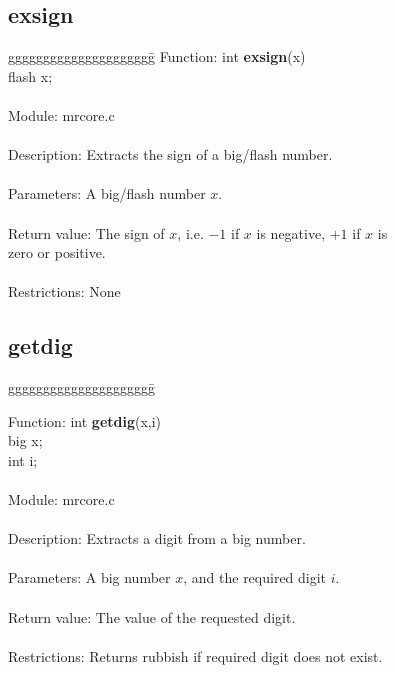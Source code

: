 \subsection{exsign}
\begin{tabbing}
ggggggggggggggggggggg\= \kill
      Function:      \>int {\bf exsign}(x)    \\
                     \>flash x; \\
      \ \\
      Module:        \>mrcore.c \\
      \ \\
      Description:   \>Extracts the sign of a big/flash number.    \\
      \ \\
      Parameters:    \>A big/flash number $x$. \\
      \ \\
      Return value:  \>The sign of $x$, i.e. $-1$ if $x$ is negative, $+1$ if $x$ is \\
                     \>zero or positive.  \\
      \ \\
      Restrictions:  \>None \\

\end{tabbing}


\subsection{getdig}

\begin{tabbing}
ggggggggggggggggggggg\= \kill

      Function:      \>int {\bf getdig}(x,i) \\
                     \>big x; \\
                     \>int i; \\
      \ \\
      Module:        \>mrcore.c \\
      \ \\
      Description:   \>Extracts a digit from a big number. \\
      \ \\
      Parameters:    \>A big number $x$, and the required digit $i$. \\
      \ \\
      Return value:  \>The value of the requested digit. \\
      \ \\
      Restrictions:  \>Returns rubbish if required digit does not exist. \\

\end{tabbing}
\pagebreak
